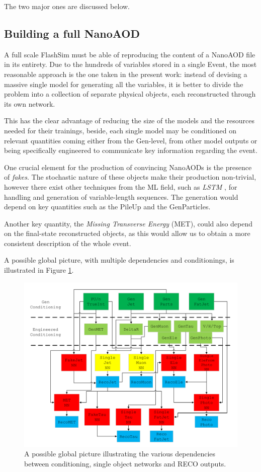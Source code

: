 The two major ones are discussed below.


\subsection{Building a full NanoAOD}
A full scale FlashSim must be able of reproducing the content of a NanoAOD file in its entirety. Due to the hundreds of variables stored in a single Event, the most reasonable approach is the one taken in the present work: instead of devising a massive single model for generating all the variables, it is better to divide the problem into a collection of separate physical objects, each reconstructed through its own network.

This has the clear advantage of reducing the size of the models and the resources needed for their trainings, beside, each single model may be conditioned on relevant quantities coming either from the Gen-level, from other model outputs or being specifically engineered to communicate key information regarding the event.

One crucial element for the production of convincing NanoAODs is the presence of \emph{fakes}. The stochastic nature of these objects make their production non-trivial, however there exist other techniques from the ML field, such as \emph{LSTM} \cite{lstm}, for handling and generation of variable-length sequences. The generation would depend on key quantities such as the PileUp and the GenParticles.

Another key quantity, the \emph{Missing Transverse Energy} (MET), could also depend on the final-state reconstructed objects, as this would allow us to obtain a more consistent description of the whole event.

A possible global picture, with multiple dependencies and conditionings, is illustrated in Figure \ref{fig:globpic}.

\begin{figure}
    \centering
    \includegraphics[width=\linewidth]{gfx/ch7/fullnanoaod.pdf}
    \caption[A global picture]{A possible global picture illustrating the various dependencies between conditioning, single object networks and RECO outputs.}
    \label{fig:globpic}
\end{figure}

